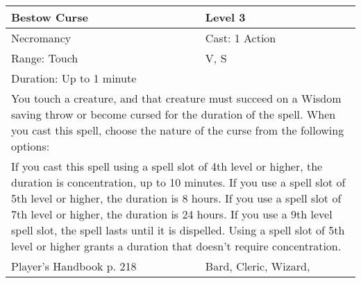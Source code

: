 \documentclass[11pt]{report}
\begin{document}
\begin{table}[H]
	\begin{tabular}{||p{6cm}|p{6cm}||}
		\hline\hline
		\bf{Bestow Curse} & Level 3\\ \hline
		Necromancy & Cast: 1 Action\\ \hline
		Range: Touch & V, S\\ \hline
		Duration: Up to 1 minute & \\ \hline
		\multicolumn{2}{||p{12cm}||}{You touch a creature, and that creature must succeed on a Wisdom saving throw or become cursed for the duration of the spell. When you cast this spell, choose the nature of the curse from the following options:}\\ \hline
		\multicolumn{2}{||p{12cm}||}{If you cast this spell using a spell slot of 4th level or higher, the duration is concentration, up to 10 minutes. 
If you use a spell slot of 5th level or higher, the duration is 8 hours. 
If you use a spell slot of 7th level or higher, the duration is 24 hours. 
If you use a 9th level spell slot, the spell lasts until it is dispelled. 
Using a spell slot of 5th level or higher grants a duration that doesn’t require concentration.}\\ \hline
Player's Handbook p. 218 & Bard, Cleric, Wizard, \\ \hline\hline
	\end{tabular}
\end{table}
\end{document}

